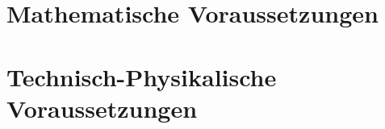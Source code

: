 \section[Mathematische Voraussetzungen]{Mathematische Voraussetzungen}

%
%
\section[Technische Voraussetzungen]{Technisch-Physikalische Voraussetzungen}
\label{sec:tech_preliminaries}
%

%
